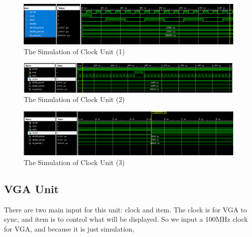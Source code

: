 \documentclass{article}
\begin{document}
    \begin{figure}[h]
\centering
\includegraphics[width=1\linewidth]{homework3-1}
\caption{The Simulation of Clock Unit (1)}
\label{fig:homework3-1}
    \end{figure}
    \begin{figure}[h]
\centering
\includegraphics[width=1\linewidth]{homework3-2}
\caption{The Simulation of Clock Unit (2)}
\label{fig:homework3-2}
    \end{figure}
    \begin{figure}[h]
\centering
\includegraphics[width=1\linewidth]{homework3-3}
\caption{The Simulation of Clock Unit (3)}
\label{fig:homework3-3}
    \end{figure}

    \subsection{VGA Unit}
    \label{sec:ps:vgaunit}

    There are two main input for this unit: clock and item. The clock is for VGA to sync, 
    and item is to control what will be displayed.
    So we input a 100MHz clock for VGA, and because it is just simulation,
    
    
\end{document}
